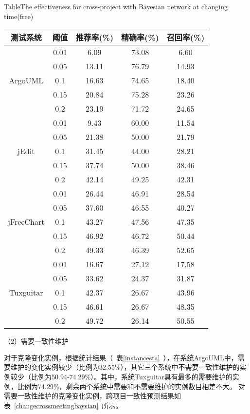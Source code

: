 \begin{table}[htbp]
{Table$\!$}{The effectiveness for cross-project with Bayesian network at changing time(free)}
\vspace{0.5em}
\centering
\wuhao
\begin{tabular}{ccccc}
\toprule[1.5pt]
{测试系统}&{阈值}&{推荐率(\%)}&{精确率(\%)}&{召回率(\%)}\\
\midrule[1pt]
\multirow{5}{*}{ArgoUML}
&0.01&	6.09&	73.08&	6.60\\
&0.05&	13.11&	76.79&	14.93\\
&0.1&	16.63&	74.65&	18.40\\
&0.15&	20.84&	75.28&	23.26\\
&0.2&	23.19&	71.72&	24.65\\
\hline
\multirow{5}{*}{jEdit}
&0.01&	9.43&	60.00&	11.54\\
&0.05&	21.38&	50.00&	21.79\\
&0.1&	31.45&	44.00&	28.21\\
&0.15&	37.74&	50.00&	38.46\\
&0.2&	42.14&	49.25&	42.31\\
\hline
\multirow{5}{*}{jFreeChart}
&0.01&	26.44&	46.91&	28.54\\
&0.05&	37.60&	46.55&	40.27\\
&0.1&	43.27&	47.56&	47.35\\
&0.15&	46.92&	46.72&	50.44\\
&0.2&	49.33&	46.39&	52.65\\
\hline
\multirow{5}{*}{Tuxguitar}
&0.01&	16.67&	27.12&	17.58\\
&0.05&	33.62&	24.37&	31.87\\
&0.1&	42.37&	26.67&	43.96\\
&0.15&	46.61&	26.67&	48.35\\
&0.2&	49.72&	26.14&	50.55\\
\bottomrule[1.5pt]
\end{tabular}
\end{table}

（2）需要一致性维护

对于克隆变化实例，根据统计结果（~表\ref{instancesta}~），在系统ArgoUML中，需要维护的变化实例较少（比例为32.55\%），其它三个系统中不需要一致性维护的实例较少（比例为50.94-74.29\%）。其中，系统Tuxguitar具有最多的需要维护的实例，比例为74.29\%，剩余两个系统中需要和不需要维护的实例数目相差不大。
对需要一致性维护的克隆变化实例，跨项目一致性预测结果如表~\ref{changecrossmeetingbaysian}~所示。

